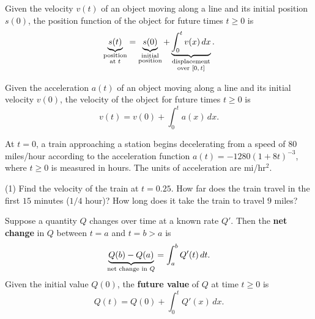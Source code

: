 \documentclass[../mathNotesPreamble]{subfiles}
\begin{document}
  \begin{thmBox*}
    Given the velocity $v(t)$ of an object moving along a line and its initial position $s(0)$, the position function of the object for future times $t\geq 0$ is
      \[\underbrace{s(t)}_{\substack{\textnormal{position}\\ \textnormal{at $t$}}}=\underbrace{s(0)}_{\substack{\textnormal{initial}\\\textnormal{position}}}+\underbrace{\int_0^t v(x)\,dx}_{\substack{\textnormal{displacement}\\\textnormal{over ${\left[0,t\right]}$}}}.\]
  \end{thmBox*}

  \begin{thmBox*}
    Given the acceleration $a(t)$ of an object moving along a line and its initial velocity $v(0)$, the velocity of the object for future times $t\geq 0$ is
      \[v(t)=v(0)+\int_0^t a(x)\,dx.\]
  \end{thmBox*}
  \pagebreak

  \begin{ex*}
    At $t=0$, a train approaching a station begins decelerating from a speed of $80$ miles/hour according to the acceleration function $a(t)=-1280(1+8t)^{-3}$, where $t\geq 0$ is measured in hours. The units of acceleration are mi/hr$^2$.
  \end{ex*}
  \begin{tasks}[after-item-skip=\stretch{1}, label=\textbullet](1)
    \task 
      Find the velocity of the train at $t=0.25$.
    \task 
      How far does the train travel in the first $15$ minutes ($1/4$ hour)? 
    \task 
      How long does it take the train to travel $9$ miles?
  \end{tasks}
  \pagebreak

  \begin{thmBox*}
    Suppose a quantity $Q$ changes over time at a known rate $Q'$. Then the \textbf{net change} in $Q$ between $t=a$ and $t=b>a$ is
      \[\underbrace{Q(b)-Q(a)}_{\textnormal{net change in }Q}=\int_a^b Q'(t)\,dt.\]
    Given the initial value $Q(0)$, the \textbf{future value} of $Q$ at time $t\geq 0$ is
      \[Q(t)=Q(0)+\int_0^t Q'(x)\,dx.\]
  \end{thmBox*}
\end{document}
